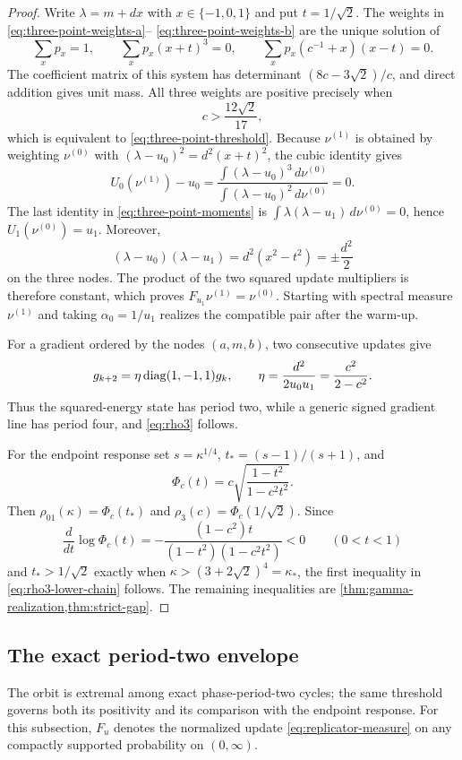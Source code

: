 \documentclass[letterpaper,twoside]{article}
\begin{document}
\begin{proof}
Write $\lambda=m+dx$ with $x\in\{-1,0,1\}$ and put $t=1/\sqrt2$.
The weights in \eqref{eq:three-point-weights-a}--
\eqref{eq:three-point-weights-b} are the unique solution of
\begin{equation}\label{eq:three-point-moments}
 \sum_x p_x=1,
 \qquad
 \sum_x p_x(x+t)^3=0,
 \qquad
 \sum_x p_x(c^{-1}+x)(x-t)=0.
\end{equation}
The coefficient matrix of this system has determinant $(8c-3\sqrt2)/c$, and
direct addition gives unit
mass.  All three weights are positive precisely when
\[
 c>\frac{12\sqrt2}{17},
\]
which is equivalent to \eqref{eq:three-point-threshold}.  Because
$\nu^{(1)}$ is obtained by weighting $\nu^{(0)}$ with
$(\lambda-u_0)^2=d^2(x+t)^2$, the cubic identity gives
\[
 U_0(\nu^{(1)})-u_0
 =\frac{\int(\lambda-u_0)^3\,d\nu^{(0)}}
 {\int(\lambda-u_0)^2\,d\nu^{(0)}}=0.
\]
The last identity in \eqref{eq:three-point-moments} is
$\int\lambda(\lambda-u_1)\,d\nu^{(0)}=0$, hence
$U_1(\nu^{(0)})=u_1$.  Moreover,
\[
 (\lambda-u_0)(\lambda-u_1)
 =d^2(x^2-t^2)=\pm\frac{d^2}{2}
\]
on the three nodes.  The product of the two squared update multipliers is
therefore constant, which proves $F_{u_1}\nu^{(1)}=\nu^{(0)}$.
Starting with spectral measure $\nu^{(1)}$ and taking
$\alpha_0=1/u_1$ realizes the compatible pair after the warm-up.

For a gradient ordered by the nodes $(a,m,b)$, two consecutive updates give
\[
 g_{k+2}=\eta\operatorname{diag}(1,-1,1)g_k,
 \qquad
 \eta=\frac{d^2}{2u_0u_1}=\frac{c^2}{2-c^2}.
\]
Thus the squared-energy state has period two, while a generic signed gradient
line has period four, and \eqref{eq:rho3} follows.

For the endpoint response set $s=\kappa^{1/4}$,
$t_*=(s-1)/(s+1)$, and
\[
 \Phi_c(t)=c\sqrt{\frac{1-t^2}{1-c^2t^2}}.
\]
Then $\rho_{01}(\kappa)=\Phi_c(t_*)$ and
$\rho_3(c)=\Phi_c(1/\sqrt2)$.  Since
\[
 \frac{d}{dt}\log\Phi_c(t)
 =-\frac{(1-c^2)t}{(1-t^2)(1-c^2t^2)}<0
 \qquad(0<t<1)
\]
and $t_*>1/\sqrt2$ exactly when
$\kappa>(3+2\sqrt2)^4=\kappa_*$, the first inequality in
\eqref{eq:rho3-lower-chain} follows.  The remaining inequalities are
\cref{thm:gamma-realization,thm:strict-gap}.
\end{proof}


\subsection{The exact period-two envelope}

The orbit is extremal among exact phase-period-two cycles; the same threshold
governs both its positivity and its comparison with the endpoint response.
For this subsection, $F_u$ denotes the normalized update
\eqref{eq:replicator-measure} on any compactly supported probability on
$(0,\infty)$.
\end{document}
